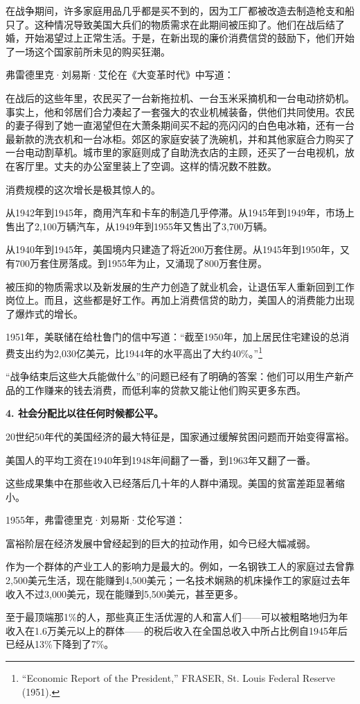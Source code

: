 在战争期间，许多家庭用品几乎都是买不到的，因为工厂都被改造去制造枪支和船只了。这种情况导致美国大兵们的物质需求在此期间被压抑了。他们在战后结了婚，开始渴望过上正常生活。于是，在新出现的廉价消费信贷的鼓励下，他们开始了一场这个国家前所未见的购买狂潮。

弗雷德里克·刘易斯·艾伦在《大变革时代》中写道：

{\kaishu

在战后的这些年里，农民买了一台新拖拉机、一台玉米采摘机和一台电动挤奶机。事实上，他和邻居们合力凑起了一套强大的农业机械装备，供他们共同使用。农民的妻子得到了她一直渴望但在大萧条期间买不起的亮闪闪的白色电冰箱，还有一台最新款的洗衣机和一台冰柜。郊区的家庭安装了洗碗机，并和其他家庭合力购买了一台电动割草机。城市里的家庭则成了自助洗衣店的主顾，还买了一台电视机，放在客厅里。丈夫的办公室里装上了空调。这样的情况数不胜数。

}

消费规模的这次增长是极其惊人的。

从1942年到1945年，商用汽车和卡车的制造几乎停滞。从1945年到1949年，市场上售出了2,100万辆汽车，从1949年到1955年又售出了3,700万辆。

从1940年到1945年，美国境内只建造了将近200万套住房。从1945年到1950年，又有700万套住房落成。到1955年为止，又涌现了800万套住房。

被压抑的物质需求以及新发展的生产力创造了就业机会，让退伍军人重新回到工作岗位上。而且，这些都是好工作。再加上消费信贷的助力，美国人的消费能力出现了爆炸式的增长。

1951年，美联储在给杜鲁门的信中写道：“截至1950年，加上居民住宅建设的总消费支出约为2,030亿美元，比1944年的水平高出了大约40\%。”\footnote{“Economic Report of the President,” FRASER, St. Louis Federal Reserve (1951).}

“战争结束后这些大兵能做什么”的问题已经有了明确的答案：他们可以用生产新产品的工作赚来的钱去消费，而低利率的贷款又能让他们购买更多东西。

\textbf{4. 社会分配比以往任何时候都公平。}

20世纪50年代的美国经济的最大特征是，国家通过缓解贫困问题而开始变得富裕。

美国人的平均工资在1940年到1948年间翻了一番，到1963年又翻了一番。

这些成果集中在那些收入已经落后几十年的人群中涌现。美国的贫富差距显著缩小。

1955年，弗雷德里克·刘易斯·艾伦写道：

{\kaishu

富裕阶层在经济发展中曾经起到的巨大的拉动作用，如今已经大幅减弱。

作为一个群体的产业工人的影响力是最大的。例如，一名钢铁工人的家庭过去曾靠2,500美元生活，现在能赚到4,500美元；一名技术娴熟的机床操作工的家庭过去年收入不过3,000美元，现在能赚到5,500美元，甚至更多。

至于最顶端那1\%的人，那些真正生活优渥的人和富人们——可以被粗略地归为年收入在1.6万美元以上的群体——的税后收入在全国总收入中所占比例自1945年后已经从13\%下降到了7\%。

}

